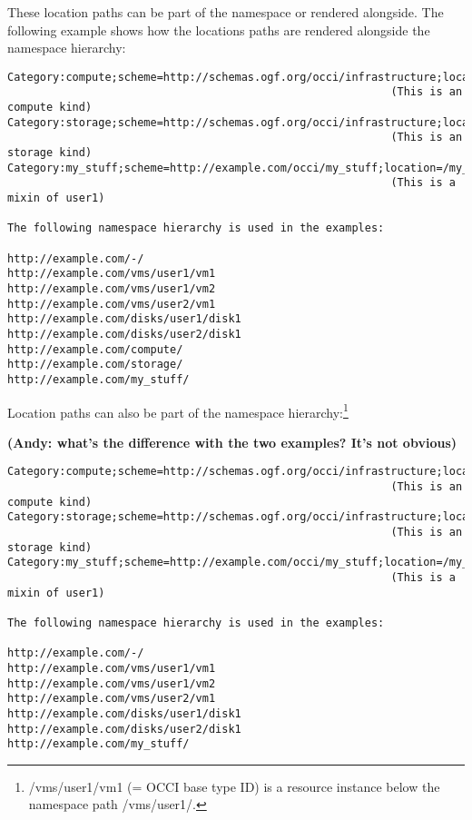\documentclass[10pt,a4paper]{article}
\begin{document}
These location paths can be part of the namespace or rendered
alongside. The following example shows how the locations paths are
rendered alongside the namespace hierarchy:

\begin{verbatim}
Category:compute;scheme=http://schemas.ogf.org/occi/infrastructure;location=/compute 
                                                           (This is an compute kind)
Category:storage;scheme=http://schemas.ogf.org/occi/infrastructure;location=/storage 
                                                           (This is an storage kind)
Category:my_stuff;scheme=http://example.com/occi/my_stuff;location=/my_stuff 
                                                           (This is a mixin of user1)

The following namespace hierarchy is used in the examples:

http://example.com/-/
http://example.com/vms/user1/vm1
http://example.com/vms/user1/vm2
http://example.com/vms/user2/vm1
http://example.com/disks/user1/disk1
http://example.com/disks/user2/disk1
http://example.com/compute/
http://example.com/storage/
http://example.com/my_stuff/
\end{verbatim}

Location paths can also be part of the namespace
hierarchy:\footnote{/vms/user1/vm1 (= OCCI base type ID) is a resource
  instance below the namespace path /vms/user1/.}

\textbf{(Andy: what's the difference with the two examples? It's not obvious)}

\begin{verbatim}
Category:compute;scheme=http://schemas.ogf.org/occi/infrastructure;location=/vms 
                                                           (This is an compute kind)
Category:storage;scheme=http://schemas.ogf.org/occi/infrastructure;location=/disks 
                                                           (This is an storage kind)
Category:my_stuff;scheme=http://example.com/occi/my_stuff;location=/my_stuff 
                                                           (This is a mixin of user1)

The following namespace hierarchy is used in the examples:

http://example.com/-/
http://example.com/vms/user1/vm1
http://example.com/vms/user1/vm2
http://example.com/vms/user2/vm1
http://example.com/disks/user1/disk1
http://example.com/disks/user2/disk1
http://example.com/my_stuff/
\end{verbatim}
\end{document}
